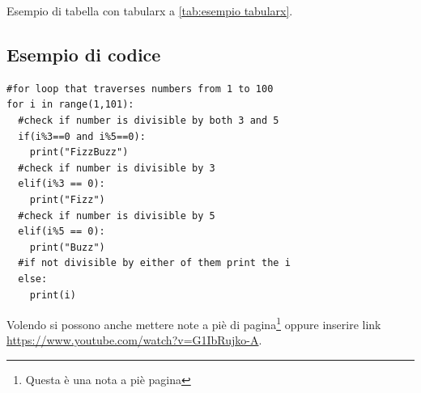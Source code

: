 Esempio di tabella con tabularx a \ref{tab:esempio tabularx}.

\subsection{Esempio di codice}

\begin{lstlisting}[style=py, caption=Script Python.]
#for loop that traverses numbers from 1 to 100
for i in range(1,101):
  #check if number is divisible by both 3 and 5
  if(i%3==0 and i%5==0):
    print("FizzBuzz")
  #check if number is divisible by 3
  elif(i%3 == 0):
    print("Fizz")
  #check if number is divisible by 5
  elif(i%5 == 0):
    print("Buzz")
  #if not divisible by either of them print the i
  else:
    print(i)
\end{lstlisting}
\label{script}

Volendo si possono anche mettere note a piè di pagina\footnote{Questa è una nota a piè pagina} oppure inserire link \url{https://www.youtube.com/watch?v=G1IbRujko-A}.
